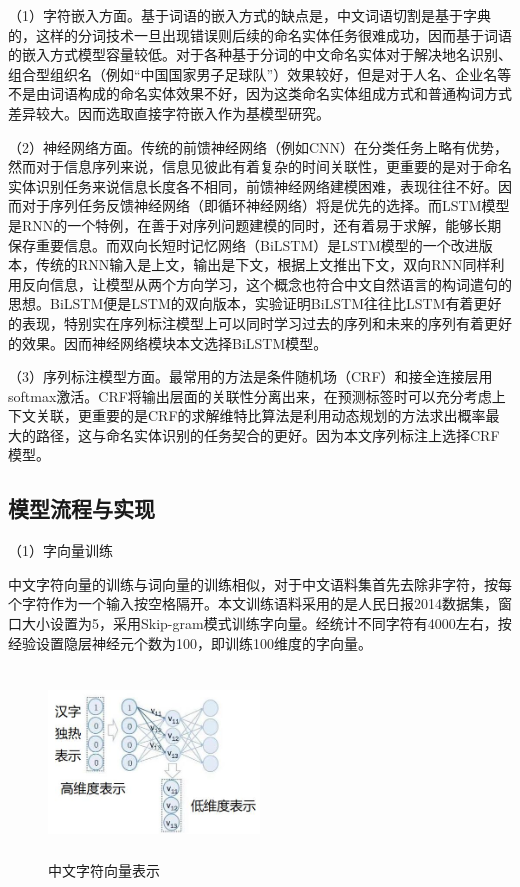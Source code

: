 \documentclass[winfonts,master,oneside,nobackinfo]{njuthesis}
\begin{document}
（1）字符嵌入方面。基于词语的嵌入方式的缺点是，中文词语切割是基于字典的，这样的分词技术一旦出现错误则后续的命名实体任务很难成功，因而基于词语的嵌入方式模型容量较低。对于各种基于分词的中文命名实体对于解决地名识别、组合型组织名（例如“中国国家男子足球队”）效果较好，但是对于人名、企业名等不是由词语构成的命名实体效果不好，因为这类命名实体组成方式和普通构词方式差异较大。因而选取直接字符嵌入作为基模型研究。

（2）神经网络方面。传统的前馈神经网络（例如CNN）在分类任务上略有优势，然而对于信息序列来说，信息见彼此有着复杂的时间关联性，更重要的是对于命名实体识别任务来说信息长度各不相同，前馈神经网络建模困难，表现往往不好。因而对于序列任务反馈神经网络（即循环神经网络）将是优先的选择。而LSTM模型是RNN的一个特例，在善于对序列问题建模的同时，还有着易于求解，能够长期保存重要信息。而双向长短时记忆网络（BiLSTM）是LSTM模型的一个改进版本，传统的RNN输入是上文，输出是下文，根据上文推出下文，双向RNN同样利用反向信息，让模型从两个方向学习，这个概念也符合中文自然语言的构词遣句的思想。BiLSTM便是LSTM的双向版本，实验证明BiLSTM往往比LSTM有着更好的表现\cite{Graves}，特别实在序列标注模型上\cite{Huang}可以同时学习过去的序列和未来的序列有着更好的效果。因而神经网络模块本文选择BiLSTM模型。

（3）序列标注模型方面。最常用的方法是条件随机场（CRF）和接全连接层用softmax激活。CRF将输出层面的关联性分离出来，在预测标签时可以充分考虑上下文关联，更重要的是CRF的求解维特比算法是利用动态规划的方法求出概率最大的路径，这与命名实体识别的任务契合的更好。因为本文序列标注上选择CRF模型。

\subsection{模型流程与实现}

（1）字向量训练

中文字符向量的训练与词向量的训练相似，对于中文语料集首先去除非字符，按每个字符作为一个输入按空格隔开。本文训练语料采用的是人民日报2014数据集，窗口大小设置为5，采用Skip-gram模式训练字向量。经统计不同字符有4000左右，按经验设置隐层神经元个数为100，即训练100维度的字向量。

\begin{figure}[h]
\centering
\begin{minipage}[t]{\textwidth}
\includegraphics[width=0.5\textwidth,height=5.0cm]{./figure/char2vec.jpg}
\caption{中文字符向量表示}
\label{lab:1}
\end{minipage}
\end{figure}
\end{document}
